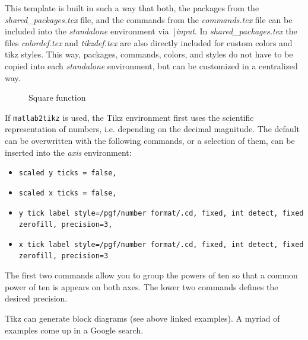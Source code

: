 This template is built in such a way that both, the packages from the \textit{shared\_packages.tex} file, and the commands from the \textit{commands.tex} file can be included into the \textit{standalone} environment via \textit{\textbackslash input}.
In \textit{shared\_packages.tex} the files \textit{colordef.tex} and \textit{tikzdef.tex} are also directly included for custom colors and tikz styles. 
This way, packages, commands, colors, and styles do not have to be copied into each \textit{standalone} environment, but can be customized in a centralized way.

\begin{figure}[h]
	\centering
	
	\caption{Square function}
	\label{fig:tikz:x_square}
\end{figure}



If \texttt{matlab2tikz} is used, the Tikz environment first uses the scientific representation of numbers, i.e. depending on the decimal magnitude.
The default can be overwritten with the following commands, or a selection of them, can be inserted into the \textit{axis} environment:

\begin{itemize}
         \item \texttt{scaled y ticks = false,} 
         \item \texttt{scaled x ticks = false,}
         \item \texttt{y tick label style={/pgf/number format/.cd, fixed, int detect, fixed zerofill, precision=3},}
         \item \texttt{x tick label style={/pgf/number format/.cd, fixed, int detect, fixed zerofill, precision=3}}
\end{itemize}

The first two commands allow you to group the powers of ten so that a common power of ten is appears on both axes.
The lower two commands defines the desired precision.



Tikz can generate block diagrams (see above linked examples).
A myriad of examples come up in a Google search.


